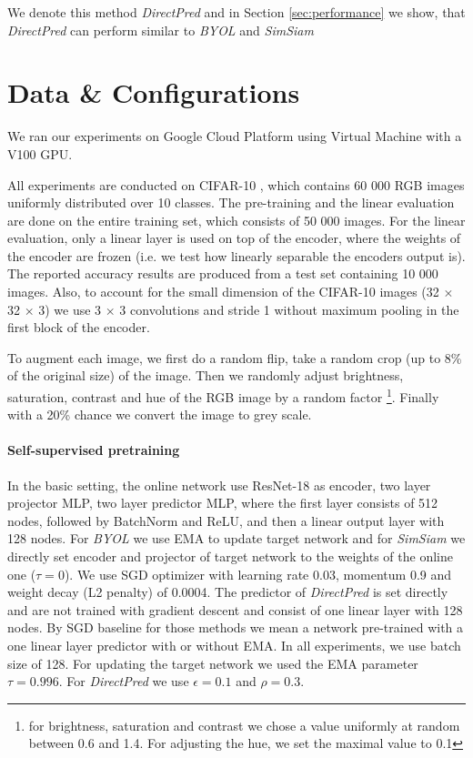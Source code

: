 We denote this method \emph{DirectPred} and in Section \ref{sec:performance} we show, that \emph{DirectPred} can perform similar to \emph{BYOL} and \emph{SimSiam}

\section{Data \& Configurations}
\label{sec:data}

We ran our experiments on Google Cloud Platform using Virtual Machine with a V100 GPU.

All experiments are conducted on CIFAR-10 \cite{cifar10}, which contains 60 000 RGB images uniformly distributed over 10 classes. The pre-training and the linear evaluation are done on the entire training set, which consists of 50 000 images. For the linear evaluation, only a linear layer is used on top of the encoder, where the weights of the encoder are frozen (i.e. we test how linearly separable the encoders output is). The reported accuracy results are produced from a test set containing 10 000 images. Also, to account for the small dimension of the CIFAR-10 images (32 $\times$ 32 $\times$ 3) we use 3 $\times$ 3 convolutions and stride 1 without maximum pooling in the first block of the encoder. 

To augment each image, we first do a random flip, take a random crop (up to 8\% of the original size) of the image. Then we randomly adjust brightness, saturation, contrast and hue of the RGB image by a random factor \footnote{for brightness, saturation and contrast we chose a value uniformly at random between 0.6 and 1.4. For adjusting the hue, we set the maximal value to 0.1}. Finally with a 20\% chance we convert the image to grey scale.

\paragraph{Self-supervised pretraining}

In the basic setting, the online network use ResNet-18 as encoder, two layer projector MLP, two layer predictor MLP, where the first layer consists of 512 nodes, followed by BatchNorm and ReLU, and then a linear output layer with 128 nodes. For \emph{BYOL} we use EMA to update target network and for \emph{SimSiam} we directly set encoder and projector of target network to the weights of the online one ($\tau = 0$). We use SGD optimizer with learning rate 0.03, momentum 0.9 and weight decay (L2 penalty) of 0.0004. The predictor of \emph{DirectPred} is set directly and are not trained with gradient descent and consist of one linear layer with 128 nodes. By SGD baseline for those methods we mean a network pre-trained with a one linear layer predictor with or without EMA. In all experiments, we use batch size of 128. For updating the target network we used the EMA parameter $\tau = 0.996$. For \emph{DirectPred} we use $\epsilon = 0.1$ and $\rho = 0.3$.

